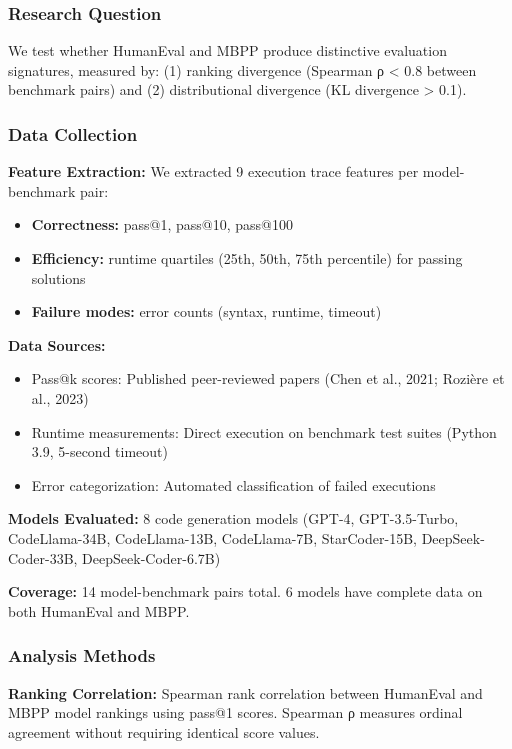 
\subsubsection{Research Question}

We test whether HumanEval and MBPP produce distinctive evaluation signatures, measured by: (1) ranking divergence (Spearman ρ < 0.8 between benchmark pairs) and (2) distributional divergence (KL divergence > 0.1).

\subsubsection{Data Collection}

\textbf{Feature Extraction:} We extracted 9 execution trace features per model-benchmark pair:
\begin{itemize}
\item \textbf{Correctness:} pass@1, pass@10, pass@100
\item \textbf{Efficiency:} runtime quartiles (25th, 50th, 75th percentile) for passing solutions
\item \textbf{Failure modes:} error counts (syntax, runtime, timeout)
\end{itemize}

\textbf{Data Sources:}
\begin{itemize}
\item Pass@k scores: Published peer-reviewed papers (Chen et al., 2021; Rozière et al., 2023)
\item Runtime measurements: Direct execution on benchmark test suites (Python 3.9, 5-second timeout)
\item Error categorization: Automated classification of failed executions
\end{itemize}

\textbf{Models Evaluated:} 8 code generation models (GPT-4, GPT-3.5-Turbo, CodeLlama-34B, CodeLlama-13B, CodeLlama-7B, StarCoder-15B, DeepSeek-Coder-33B, DeepSeek-Coder-6.7B)

\textbf{Coverage:} 14 model-benchmark pairs total. 6 models have complete data on both HumanEval and MBPP.

\subsubsection{Analysis Methods}

\textbf{Ranking Correlation:} Spearman rank correlation between HumanEval and MBPP model rankings using pass@1 scores. Spearman ρ measures ordinal agreement without requiring identical score values.


